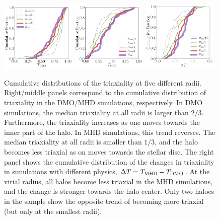 \documentclass[usenatbib]{mnras}
\begin{document}
\begin{figure}
\includegraphics[width=0.32\textwidth]{triaxialiy_distro_DM.pdf}
\includegraphics[width=0.32\textwidth]{triaxialiy_distro_MHD.pdf}
\includegraphics[width=0.32\textwidth]{delta_triaxiality_distro.pdf}
\caption{Cumulative distributions of the triaxiality at five different radii.
  Right/middle panels correspond to the cumulative distribution of
  triaxiality in the DMO/MHD simulations, respectively. 
  In DMO simulations, the median triaxiality at all radii is larger
  than $2/3$. Furthermore, the triaxiality increases as one moves
  towards the inner part of the halo.
  In MHD simulations, this trend reverses.
  The median triaxiality at all radii is smaller than $1/3$, and the
  halo becomes less triaxial as on moves towards the stellar disc.
  The right panel shows the cumulative distribution of the changes
  in triaxiality in simulations with different physics, $\Delta
  T=T_{\rm MHD}-T_{\rm DMO}$. 
  At the virial radius, all halos become less triaxial in the MHD
  simulations, and the change is stronger towards the halo center.
  Only two haloes in the sample show the opposite trend of becoming
  more triaxial (but only at the smallest radii).} 
\label{fig:triaxial_cumulative}
\end{figure}
\end{document}
